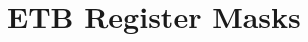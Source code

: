 \hypertarget{group___e_t_b___register___masks}{}\section{E\+T\+B Register Masks}
\label{group___e_t_b___register___masks}
